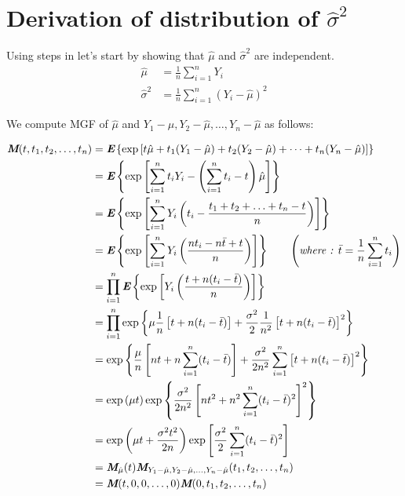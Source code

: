 \section{Derivation of distribution of $\hat{\sigma}^2$}
\label{sigma_hat_distribution_2}

Using steps in \cite[p. 339-341]{Rohathi2001} let's start by showing that $\hat{\mu}$ and $\hat{\sigma}^2$ are independent.
\begin{equation}
\begin{aligned}
     \hat{\mu} &= \frac{1}{n}\sum_{i=1}^{n}Y_i \\
\hat{\sigma}^2 &= \frac{1}{n}\sum_{i=1}^{n}(Y_i - \hat{\mu})^2
\end{aligned}
\end{equation}

We compute MGF of $\hat{\mu}$ and $Y_1-\hat{\mu}, Y_2-\hat{\mu}, \ldots, Y_n-\hat{\mu}$ as follows:

\begin{equation}
\begin{aligned}
\textbf{\em M}(t, t_1, t_2, \ldots, t_n) & = \textbf{\em E}\left\{\exp\left[t\hat{\mu} + t_1(Y_1-\hat{\mu}) + t_2(Y_2-\hat{\mu}) + \cdots + t_n(Y_n-\hat{\mu})\right]\right\} \\
																		 & = \textbf{\em E}\left\{\exp\left[\sum_{i=1}^nt_iY_i - \left(\sum_{i=1}^nt_i - t\right)\hat{\mu}\right]\right\} \\
																		 & = \textbf{\em E}\left\{\exp\left[\sum_{i=1}^nY_i\left(t_i - \frac{t_1 + t_2 + \ldots + t_n - t}{n}\right)\right]\right\} \\
																		 & = \textbf{\em E}\left\{\exp\left[\sum_{i=1}^nY_i\left(\frac{nt_i - n\bar{t} + t}{n}\right)\right]\right\} 
																							\qquad \left(\textit{where : }\bar{t} = \frac{1}{n}\sum_{i=1}^nt_i\right)  \\
																		 & = \prod_{i=1}^n\textbf{\em E}\left\{\exp\left[Y_i\left(\frac{t + n(t_i - \bar{t}) }{n}\right)\right]\right\} \\
																		 & = \prod_{i=1}^n\exp\left\{\mu\frac{1}{n}\left[t + n(t_i -\bar{t})\right] + \frac{\sigma^2}{2}\frac{1}{n^2}\left[t + n(t_i -\bar{t})\right]^2\right\} \\
																		 & = \exp\left\{\frac{\mu}{n}\left[nt + n\sum_{i=1}^n(t_i -\bar{t})\right] + \frac{\sigma^2}{2n^2}\sum_{i=1}^n\left[t + n(t_i -\bar{t})\right]^2\right\} \\
																		 & = \exp\left(\mu t\right)\exp\left\{\frac{\sigma^2}{2n^2}\left[nt^2 + n^2\sum_{i=1}^n(t_i -\bar{t})^2\right]^2\right\} \\
																		 & = \exp\left(\mu t + \frac{\sigma^2t^2}{2n}\right)\exp\left[\frac{\sigma^2}{2}\sum_{i=1}^n(t_i -\bar{t})^2\right] \\
																		 & = \textbf{\em M}_{\hat{\mu}}(t)\textbf{\em M}_{Y_1-\hat{\mu}, Y_2-\hat{\mu}, \ldots, Y_n-\hat{\mu}}(t_1, t_2, \ldots, t_n) \\
																		 & = \textbf{\em M}(t, 0, 0, \ldots,0)\textbf{\em M}(0, t_1, t_2, \ldots, t_n)
\end{aligned}
\end{equation}

